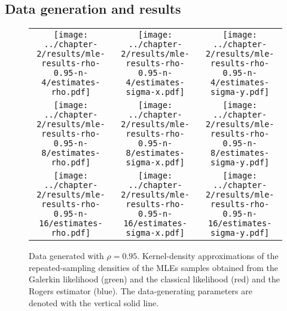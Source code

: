 \subsection{Data generation and results}
\begin{figure}
  \centering
  \begin{tabular}{ccc}
    \begin{minipage}{0.3\textwidth}
      \centering
      \texttt{[image: ../chapter-2/results/mle-results-rho-0.95-n-4/estimates-rho.pdf]}
    \end{minipage}
    & \begin{minipage}{0.3\textwidth}
      \centering
      \texttt{[image: ../chapter-2/results/mle-results-rho-0.95-n-4/estimates-sigma-x.pdf]}
    \end{minipage}
    & \begin{minipage}{0.3\textwidth}
      \centering
      \texttt{[image: ../chapter-2/results/mle-results-rho-0.95-n-4/estimates-sigma-y.pdf]}
    \end{minipage} \\
    \begin{minipage}{0.3\textwidth}
      \centering
      \texttt{[image: ../chapter-2/results/mle-results-rho-0.95-n-8/estimates-rho.pdf]}
    \end{minipage}
    & \begin{minipage}{0.3\textwidth}
      \centering
      \texttt{[image: ../chapter-2/results/mle-results-rho-0.95-n-8/estimates-sigma-x.pdf]}
    \end{minipage}
    & \begin{minipage}{0.3\textwidth}
      \centering
      \texttt{[image: ../chapter-2/results/mle-results-rho-0.95-n-8/estimates-sigma-y.pdf]}
    \end{minipage} \\
    \begin{minipage}{0.3\textwidth}
      \centering
      \texttt{[image: ../chapter-2/results/mle-results-rho-0.95-n-16/estimates-rho.pdf]}
    \end{minipage}
    & \begin{minipage}{0.3\textwidth}
      \centering
      \texttt{[image: ../chapter-2/results/mle-results-rho-0.95-n-16/estimates-sigma-x.pdf]}
    \end{minipage}
    & \begin{minipage}{0.3\textwidth}
      \centering
      \texttt{[image: ../chapter-2/results/mle-results-rho-0.95-n-16/estimates-sigma-y.pdf]}
    \end{minipage}
  \end{tabular}
  \caption{Data generated with $\rho=0.95$. Kernel-density
    approximations of the repeated-sampling densities of the MLEs
    samples obtained from the Galerkin likelihood (green) and the
    classical likelihood (red) and the Rogers estimator
    (blue). The data-generating parameters are denoted with the
    vertical solid line.}
  \label{fig:mle-comparison-rho-0.95}
\end{figure}

